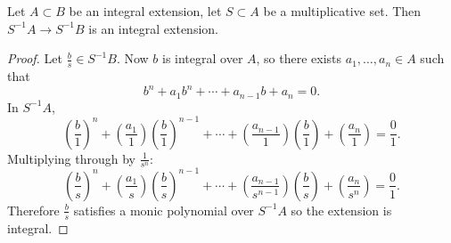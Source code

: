 \documentclass[12pt]{article}
\begin{document}
\begin{proposition}
\label{prop_localization_of_integral_ext_is_integral}
	Let $A\subset B$ be an integral extension, let $S\subset A$ be a multiplicative set. Then $S^{-1}A\to S^{-1}B$ is an integral extension.
\end{proposition}
\begin{proof}
	Let $\frac{b}{s}\in S^{-1}B$. Now $b$ is integral over $A$, so there exists $a_1,\dots,a_n\in A$ such that 
	\begin{equation*}
		b^n + a_1b^n + \cdots + a_{n-1}b + a_n = 0.
	\end{equation*}
	In $S^{-1}A$, 
	\begin{equation*}
		\left(\frac{b}{1}\right)^n + \left(\frac{a_1}{1}\right)\left(\frac{b}{1}\right)^{n-1} + \cdots + \left(\frac{a_{n-1}}{1}\right)\left(\frac{b}{1}\right) + \left(\frac{a_n}{1}\right) = \frac{0}{1}.
	\end{equation*}
	Multiplying through by $\frac{1}{s^n}$:
	\begin{equation*}
		\left(\frac{b}{s}\right)^n + \left(\frac{a_1}{s}\right)\left(\frac{b}{s}\right)^{n-1} + \cdots + \left(\frac{a_{n-1}}{s^{n-1}}\right)\left(\frac{b}{s}\right) + \left(\frac{a_n}{s^n}\right) = \frac{0}{1}.
	\end{equation*}
	Therefore $\frac{b}{s}$ satisfies a monic polynomial over $S^{-1}A$ so the extension is integral.
\end{proof}
\end{document}

